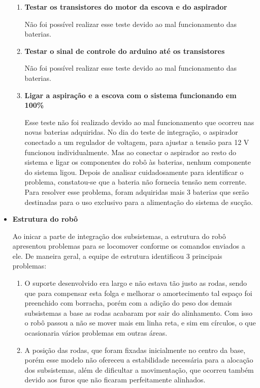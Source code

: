 \begin{itemize}
\begin{enumerate}
		      \item \textbf{Testar os transistores do motor da escova e do aspirador}

		         Não foi possível realizar esse teste devido ao mal funcionamento das baterias.

		      \item \textbf{Testar o sinal de controle do arduino até os transistores}

		         Não foi possível realizar esse teste devido ao mal funcionamento das baterias.

		      \item \textbf{Ligar a aspiração e a escova com o sistema funcionando em 100\%}

		         Esse teste não foi realizado devido ao mal funcionamento que ocorreu nas novas baterias adquiridas. No dia do teste de integração, o aspirador conectado a um regulador de voltagem, para ajustar a tensão para 12 V funcionou individualmente. Mas ao conectar o aspirador ao resto do sistema e ligar os componentes do robô às baterias, nenhum componente do sistema ligou. Depois de analisar cuidadosamente para identificar o problema, constatou-se que a bateria não fornecia tensão nem corrente. Para resolver esse problema, foram adquiridas mais 3 baterias que serão destinadas para o uso exclusivo para a alimentação do sistema de sucção.
		   \end{enumerate}

		\item \textbf{Estrutura do robô}

		Ao inicar a parte de integração dos subsistemas, a estrutura do robô apresentou problemas para se locomover conforme os comandos enviados a ele. De maneira geral, a equipe de estrutura identificou 3 principais problemas:

		\begin{enumerate}
   			\item O suporte desenvolvido era largo e não estava tão justo as rodas, sendo que para compensar esta folga e melhorar o amortecimento tal espaço foi preenchido com borracha, porém com a adição do peso dos demais subsistemas a base as rodas acabaram por sair do alinhamento. Com isso o robô passou a não se mover mais em linha reta, e sim em círculos, o que ocasionaria vários problemas em outras áreas.

   			\item A posição das rodas, que foram fixadas inicialmente no centro da base, porém esse modelo não ofereceu a estabilidade necessária para a alocação dos subsistemas, além de dificultar a movimentação, que ocorreu também devido aos furos que não ficaram perfeitamente alinhados.


\end{enumerate}
\end{itemize}
